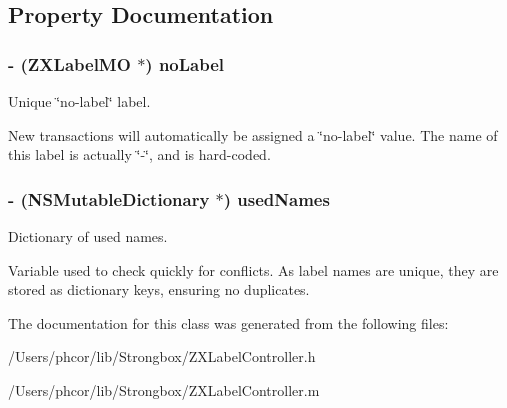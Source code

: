 \subsection{Property Documentation}
\hypertarget{interface_z_x_label_controller_f14ea66b07ab427e79c1f0a7772288fd}{
\subsubsection[{noLabel}]{\setlength{\rightskip}{0pt plus 5cm}- ({\bf ZXLabelMO} $\ast$) noLabel}}
\label{interface_z_x_label_controller_f14ea66b07ab427e79c1f0a7772288fd}


Unique \char`\"{}no-label\char`\"{} label. 

New transactions will automatically be assigned a \char`\"{}no-label\char`\"{} value. The name of this label is actually \char`\"{}-\char`\"{}, and is hard-coded. \hypertarget{interface_z_x_label_controller_3ccce02a168774242989b7c30294660e}{
\subsubsection[{usedNames}]{\setlength{\rightskip}{0pt plus 5cm}- (NSMutableDictionary $\ast$) usedNames}}
\label{interface_z_x_label_controller_3ccce02a168774242989b7c30294660e}


Dictionary of used names. 

Variable used to check quickly for conflicts. As label names are unique, they are stored as dictionary keys, ensuring no duplicates. 

The documentation for this class was generated from the following files:\begin{CompactItemize}
\item 
/Users/phcor/lib/Strongbox/ZXLabelController.h\item 
/Users/phcor/lib/Strongbox/ZXLabelController.m\end{CompactItemize}
